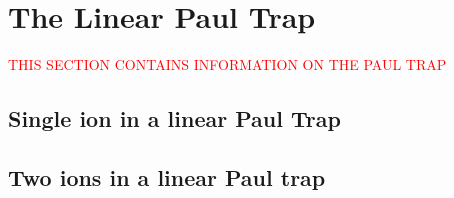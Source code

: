 \chapter{The Linear Paul Trap}
\label{chap:LinTrap}
\textcolor{red}{THIS SECTION CONTAINS INFORMATION ON THE PAUL TRAP}

\section{Single ion in a linear Paul Trap}

\section{Two ions in a linear Paul trap}




